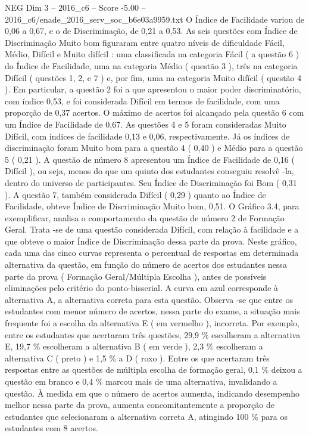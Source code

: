 \begin{textsample}{NEG Dim 3 – 2016\_c6 – Score -5.00 – 2016\_c6/enade\_2016\_serv\_soc\_b6e03a9959.txt}
O Índice de Facilidade variou de 0,06 a 0,67, e o de Discriminação, de 0,21 a 0,53.
As seis questões com Índice de Discriminação Muito bom figuraram entre quatro níveis de dificuldade Fácil, Médio, Difícil e Muito difícil : uma classificada na categoria Fácil ( a questão 6 ) do Índice de Facilidade, uma na categoria Médio ( questão 3 ), três na categoria Difícil ( questões 1, 2, e 7 ) e, por fim, uma na categoria Muito difícil ( questão 4 ).
Em particular, a questão 2 foi a que apresentou o maior poder discriminatório, com índice 0,53, e foi considerada Difícil em termos de facilidade, com uma proporção de 0,37 acertos.
O máximo de acertos foi alcançado pela questão 6 com um Índice de Facilidade de 0,67.
As questões 4 e 5 foram consideradas Muito Difícil, com índices de facilidade 0,13 e 0,06, respectivamente.
Já os índices de discriminação foram Muito bom para a questão 4 ( 0,40 ) e Médio para a questão 5 ( 0,21 ).
A questão de número 8 apresentou um Índice de Facilidade de 0,16 ( Difícil ), ou seja, menos do que um quinto dos estudantes conseguiu resolvê -la, dentro do universo de participantes.
Seu Índice de Discriminação foi Bom ( 0,31 ).
A questão 7, também considerada Difícil ( 0,29 ) quanto ao Índice de Facilidade, obteve Índice de Discriminação Muito bom, 0,51.
O Gráfico 3.4, para exemplificar, analisa o comportamento da questão de número 2 de Formação Geral.
Trata -se de uma questão considerada Difícil, com relação à facilidade e a que obteve o maior Índice de Discriminação dessa parte da prova.
Neste gráfico, cada uma das cinco curvas representa o percentual de respostas em determinada alternativa da questão, em função do número de acertos dos estudantes nessa parte da prova ( Formação Geral/Múltipla Escolha ), antes de possíveis eliminações pelo critério do ponto-bisserial.
A curva em azul corresponde à alternativa A, a alternativa correta para esta questão.
Observa -se que entre os estudantes com menor número de acertos, nessa parte do exame, a situação mais frequente foi a escolha da alternativa E ( em vermelho ), incorreta.
Por exemplo, entre os estudantes que acertaram três questões, 29,9 \% escolheram a alternativa E, 19,7 \% escolheram a alternativa B ( em verde ), 2,3 \% escolheram a alternativa C ( preto ) e 1,5 \% a D ( roxo ).
Entre os que acertaram três respostas entre as questões de múltipla escolha de formação geral, 0,1 \% deixou a questão em branco e 0,4 \% marcou mais de uma alternativa, invalidando a questão.
À medida em que o número de acertos aumenta, indicando desempenho melhor nessa parte da prova, aumenta concomitantemente a proporção de estudantes que selecionaram a alternativa correta A, atingindo 100 \% para os estudantes com 8 acertos.

\end{textsample}
